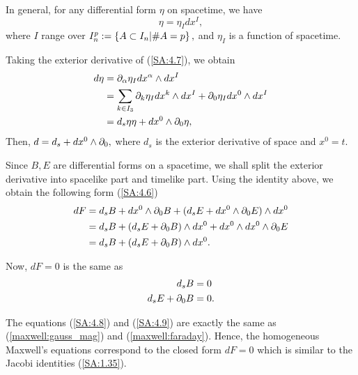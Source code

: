 In general, for any differential form $\eta$ on spacetime, we have
\begin{equation}
 \label{SA:4.7}
\eta=\eta_{I}dx^{I},
\end{equation}
where $I$ range over $I_{n}^{p}:=\left\{ A \subset I_{n} | \# A=p \right\},$ and $\eta_{I}$ is a function of spacetime.

Taking the exterior derivative of (\ref{SA:4.7}), we obtain
\begin{align*}
 d\eta &= \partial_{\alpha}\eta_{I}dx^{\alpha}\wedge dx^{I} \\
&= \sum_{k \in I_{3}}\partial_{k}\eta_{I}dx^{k}\wedge dx^{I} + \partial_{0}\eta_{I}dx^{0}\wedge dx^{I} \\
&=d_{s}\eta \eta + dx^{0} \wedge \partial_{0}\eta,
\end{align*}
Then, $d=d_{s}+dx^{0}\wedge \partial_{0},$ where $d_{s}$ is the exterior derivative of space and $x^{0}=t.$

Since $B,E$ are differential forms on a spacetime, we shall split the exterior derivative into spacelike part and timelike part. Using the identity above, we obtain the following form (\ref{SA:4.6})
\begin{align*}
 dF &= d_{s}B  + dx^{0}\wedge \partial_{0}B + (d_{s}E + dx^{0}\wedge \partial_{0}E) \wedge dx^{0} \\
&= d_{s}B + (d_{s}E+ \partial_{0}B)\wedge dx^{0} + dx^{0}\wedge dx^{0} \wedge \partial_{0}E \\
&= d_{s}B + (d_{s}E + \partial_{0}B)\wedge dx^{0}.
\end{align*}

Now, $dF=0$ is the same as
\begin{align}
 \label{SA:4.8}
d_{s}B&=0\\
\label{SA:4.9}
d_{s}E+\partial_{0}B&=0.
\end{align}

The equations (\ref{SA:4.8}) and (\ref{SA:4.9}) are exactly the same as (\ref{maxwell:gauss_mag}) and (\ref{maxwell:faraday}). Hence, the homogeneous Maxwell's equations correspond to the closed form $dF=0$ which is similar to the Jacobi identities (\ref{SA:1.35}).
